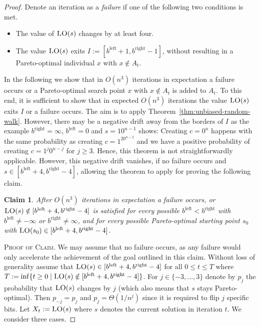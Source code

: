 \documentclass[
sigconf = false, %
review = false, %
screen = true, %
anonymous = true, %
format=acmsmall
]{acmart}
\newcommand{\LO}{\textsc{LO}\xspace}                      %
\newtheorem{claim}{Claim}
\newenvironment{proofofclaim}{\textsc{Proof of Claim.}}{\hfill\scriptsize\scalebox{1}{$\blacksquare$}}
\begin{document}
\begin{proof}
    Denote an iteration as a \emph{failure} if one of the following two conditions is met. 
    \begin{itemize}
        \item[(1)]
        The value of $\LO(s)$ changes by at least four.
        \item[(2)]
        The value $\LO(s)$ exits $I:=[b^{\text{left}} + 1, b^{\text{right}} - 1]$, without resulting in a Pareto-optimal individual $x$ with $x \notin A_t$.
    \end{itemize}
    In the following we show that in $O(n^3)$ iterations in expectation a failure occurs or a Pareto-optimal search point $x$ with $x \notin A_t$ is added to $A_t$. To this end, it is sufficient to show that in expected $O(n^3)$ iterations the value $\LO(s)$ exits $I$ or a failure occurs. The aim is to apply Theorem~\ref{thm:unbiased-random-walk}. However, there may be a negative drift away from the borders of $I$ as the example $b^{\text{right}} = \infty$, $b^{\text{left}}=0$ and $s=10^{n-1}$ shows: Creating $c=0^n$ happens with the same probability as creating $c=1^20^{n-2}$ and we have a positive probability of creating $c=1^j 0^{n-j}$ for $j \geq 3$. Hence, this theorem is not straightforwardly applicable. However, this negative drift vanishes, if no failure occurs and $s \in [b^{\text{left}} +4,b^{\text{right}} - 4]$, allowing the theorem to apply for proving the following claim. 

    \begin{claim}
    \label{cl:exit-smaller-interval}
    After $O(n^3)$ iterations in expectation a failure occurs, or $\LO(s) \notin [b^{\text{left}} +4,b^{\text{right}} - 4]$ is satisfied for every possible $b^{\text{left}}<b^{\text{right}}$ with $b^{\text{left}} \neq -\infty$ or $b^{\text{right}} \neq \infty$, and for every possible Pareto-optimal starting point $s_0$ with $\LO(s_0) \in [b^{\text{left}} +4,b^{\text{right}} - 4]$.
    \end{claim}
    
    \begin{proofofclaim}
    We may assume that no failure occurs, as any failure would only accelerate the achievement of the goal outlined in this claim. Without loss of generality assume that $\LO(s) \in [b^{\text{left}} +4,b^{\text{right}} - 4]$ for all $0 \leq t \leq T$ where $T:=\inf\{t \geq 0 \mid \LO(s) \notin [b^{\text{left}} +4,b^{\text{right}} - 4]\}$. For $j \in \{-3, \ldots , 3\}$ denote by $p_j$ the probability that $\LO(s)$ changes by $j$ (which also means that $s$ stays Pareto-optimal). Then $p_{-j} = p_j$ and $p_j = \Theta(1/n^j)$ since it is required to flip $j$ specific bits. Let $X_t:=\LO(s)$ where $s$ denotes the current solution in iteration $t$. We consider three cases.


\end{proofofclaim}
\end{proof}
\end{document}
